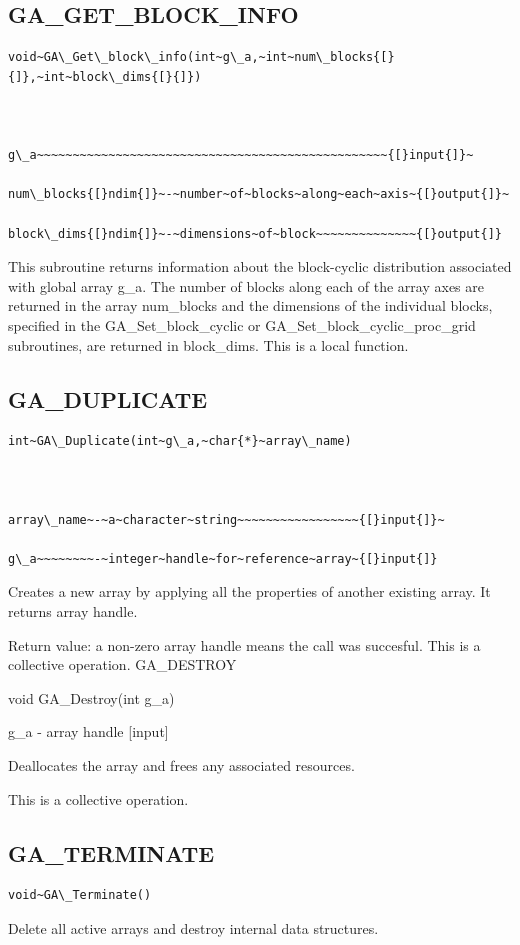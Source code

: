 \subsection*{\label{sub:GA_GET_BLOCK_INFO}GA\_GET\_BLOCK\_INFO}
\begin{verbatim}
void~GA\_Get\_block\_info(int~g\_a,~int~num\_blocks{[}{]},~int~block\_dims{[}{]})



g\_a~~~~~~~~~~~~~~~~~~~~~~~~~~~~~~~~~~~~~~~~~~~~~~~~~{[}input{]}~

num\_blocks{[}ndim{]}~-~number~of~blocks~along~each~axis~{[}output{]}~

block\_dims{[}ndim{]}~-~dimensions~of~block~~~~~~~~~~~~~~{[}output{]}
\end{verbatim}
This subroutine returns information about the block-cyclic distribution
associated with global array g\_a. The number of blocks along each
of the array axes are returned in the array num\_blocks and the dimensions
of the individual blocks, specified in the GA\_Set\_block\_cyclic
or GA\_Set\_block\_cyclic\_proc\_grid subroutines, are returned in
block\_dims. This is a local function. 


\subsection*{\label{sub:GA_DUPLICATE}GA\_DUPLICATE}
\begin{verbatim}
int~GA\_Duplicate(int~g\_a,~char{*}~array\_name)



array\_name~-~a~character~string~~~~~~~~~~~~~~~~~{[}input{]}~

g\_a~~~~~~~~-~integer~handle~for~reference~array~{[}input{]}
\end{verbatim}
Creates a new array by applying all the properties of another existing
array. It returns array handle.

Return value: a non-zero array handle means the call was succesful.
This is a collective operation. GA\_DESTROY

void GA\_Destroy(int g\_a)

g\_a - array handle {[}input{]}

Deallocates the array and frees any associated resources.

This is a collective operation. 


\subsection*{\label{sub:GA_TERMINATE}GA\_TERMINATE}
\begin{verbatim}
void~GA\_Terminate()
\end{verbatim}
Delete all active arrays and destroy internal data structures.

